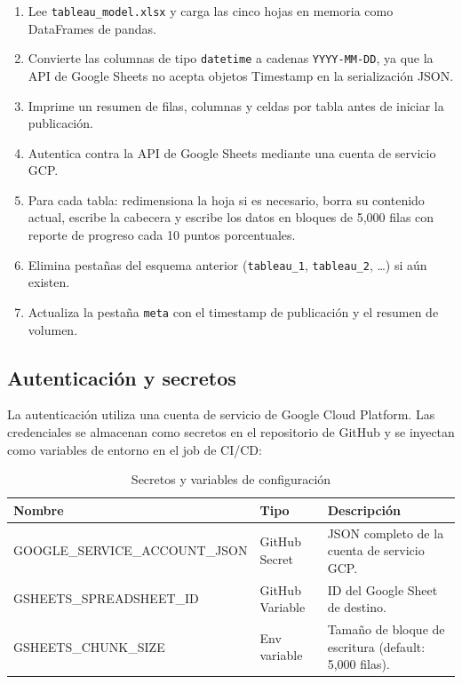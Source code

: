 \documentclass[12pt, letterpaper]{article}
\begin{document}
\begin{enumerate}[noitemsep]
    \item Lee \texttt{tableau\_model.xlsx} y carga las cinco hojas en memoria como DataFrames de pandas.
    \item Convierte las columnas de tipo \texttt{datetime} a cadenas \texttt{YYYY-MM-DD}, ya que la API de Google Sheets no acepta objetos Timestamp en la serialización JSON.
    \item Imprime un resumen de filas, columnas y celdas por tabla antes de iniciar la publicación.
    \item Autentica contra la API de Google Sheets mediante una cuenta de servicio GCP.
    \item Para cada tabla: redimensiona la hoja si es necesario, borra su contenido actual, escribe la cabecera y escribe los datos en bloques de 5,000 filas con reporte de progreso cada 10 puntos porcentuales.
    \item Elimina pestañas del esquema anterior (\texttt{tableau\_1}, \texttt{tableau\_2}, \ldots) si aún existen.
    \item Actualiza la pestaña \texttt{meta} con el timestamp de publicación y el resumen de volumen.
\end{enumerate}

\subsection{Autenticación y secretos}

La autenticación utiliza una cuenta de servicio de Google Cloud Platform. Las credenciales se almacenan como secretos en el repositorio de GitHub y se inyectan como variables de entorno en el job de CI/CD:

\begin{table}[H]
\centering
\caption{Secretos y variables de configuración}
\label{tab:secretos}
\small
\begin{tabularx}{\textwidth}{>{\ttfamily}l l X}
\toprule
\textbf{Nombre} & \textbf{Tipo} & \textbf{Descripción} \\
\midrule
GOOGLE\_SERVICE\_ACCOUNT\_JSON & GitHub Secret   & JSON completo de la cuenta de servicio GCP. \\
GSHEETS\_SPREADSHEET\_ID       & GitHub Variable & ID del Google Sheet de destino. \\
GSHEETS\_CHUNK\_SIZE           & Env variable    & Tamaño de bloque de escritura (default: 5,000 filas). \\
\bottomrule
\end{tabularx}
\end{table}
\end{document}
